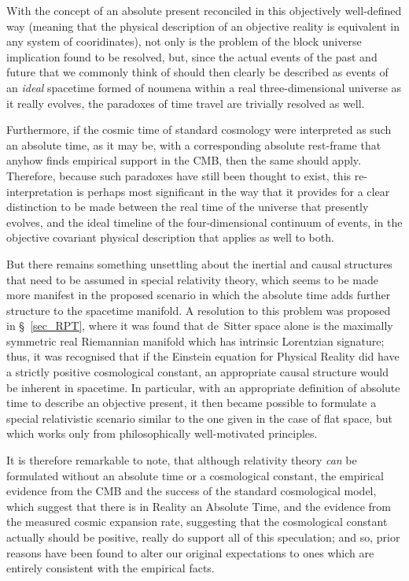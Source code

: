 With the concept of an absolute present reconciled in this objectively well-defined way (meaning that the physical description of an objective reality is equivalent in any system of cooridinates), not only is the problem of the block universe implication found to be resolved, but, since the actual events of the past and future that we commonly think of should then clearly be described as events of an \textit{ideal} spacetime formed of noumena within a real three-dimensional universe as it really evolves, the paradoxes of time travel are trivially resolved as well.

Furthermore, if the cosmic time of standard cosmology were interpreted as such an absolute time, as it may be, with a corresponding absolute rest-frame that anyhow finds empirical support in the CMB, then the same should apply. Therefore, because such paradoxes have still been thought to exist, this re-interpretation is perhaps most significant in the way that it provides for a clear distinction to be made between the real time of the universe that presently evolves, and the ideal timeline of the four-dimensional continuum of events, in the objective covariant physical description that applies as well to both.

But there remains something unsettling about the inertial and causal structures that need to be assumed in special relativity theory, which seems to be made more manifest in the proposed scenario in which the absolute time adds further structure to the spacetime manifold. A resolution to this problem was proposed in \S~\ref{sec_RPT}, where it was found that de~Sitter space alone is the maximally symmetric real Riemannian manifold which has intrinsic Lorentzian signature; thus, it was recognised that if the Einstein equation for Physical Reality did have a strictly positive cosmological constant, an appropriate causal structure would be inherent in spacetime. In particular, with an appropriate definition of absolute time to describe an objective present, it then became possible to formulate a special relativistic scenario similar to the one given in the case of flat space, but which works only from philosophically well-motivated principles.

It is therefore remarkable to note, that although relativity theory \textit{can} be formulated without an absolute time or a cosmological constant, the empirical evidence from the CMB and the success of the standard cosmological model, which suggest that there is in Reality an Absolute Time, and the evidence from the measured cosmic expansion rate, suggesting that the cosmological constant actually should be positive, really do support all of this speculation; and so, prior reasons have been found to alter our original expectations to ones which are entirely consistent with the empirical facts.


